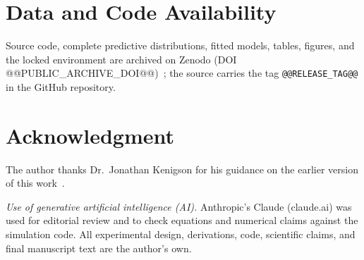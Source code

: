\documentclass{ieeeaccess}
\begin{document}
\section{\texorpdfstring{\break}{}Data and Code Availability}\label{app:repro}
Source code, complete predictive distributions, fitted models, tables, figures, and the locked environment are archived on Zenodo (DOI @@PUBLIC_ARCHIVE_DOI@@)~\cite{jasti2026code}; the source carries the tag \texttt{@@RELEASE_TAG@@} in the GitHub repository.

\section*{Acknowledgment}
The author thanks Dr.~Jonathan Kenigson for his guidance on the earlier version of this work~\cite{jasti2026preprint}. 

\emph{Use of generative artificial intelligence (AI).} Anthropic’s Claude (claude.ai) was used for editorial review and to check equations and numerical claims against the simulation code. All experimental design, derivations, code, scientific claims, and final manuscript text are the author’s own.
\end{document}
